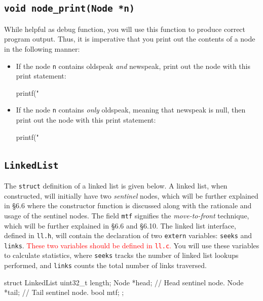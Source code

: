 \documentclass{article}
\begin{document}
\subsection{\texttt{void node\_print(Node *n)}}

While helpful as debug function, you will use this function to produce
correct program output. Thus, it is imperative that you print out the
contents of a node in the following manner:

\begin{itemize}
  \item If the node \texttt{n} contains oldspeak \emph{and} newspeak,
    print out the node with this print statement:
    \begin{codelisting}{}
printf("%
    \end{codelisting}
  \item If the node \texttt{n} contains \emph{only} oldspeak, meaning
    that newspeak is null, then print out the node with this print
    statement:
    \begin{codelisting}{}
printf("%
    \end{codelisting}
\end{itemize}

\subsection{\texttt{LinkedList}}

The \texttt{struct} definition of a linked list is given below. A
linked list, when constructed, will initially have two \emph{sentinel}
nodes, which will be further explained in \S 6.6 where the constructor
function is discussed along with the rationale and usage of the sentinel
nodes. The field \texttt{mtf} signifies the \emph{move-to-front}
technique, which will be further explained in \S 6.6 and \S 6.10. The
linked list interface, defined in \texttt{ll.h}, will contain the
declaration of two \texttt{extern} variables: \texttt{seeks} and
\texttt{links}. \textcolor{red}{These two variables should be defined in
\texttt{ll.c}.} You will use these variables to calculate statistics,
where \texttt{seeks} tracks the number of linked list lookups performed,
and \texttt{links} counts the total number of links traversed.

\begin{codelisting}{}
struct LinkedList {
  uint32_t length;
  Node *head; // Head sentinel node.
  Node *tail; // Tail sentinel node.
  bool mtf;
};
\end{codelisting}
\end{document}
